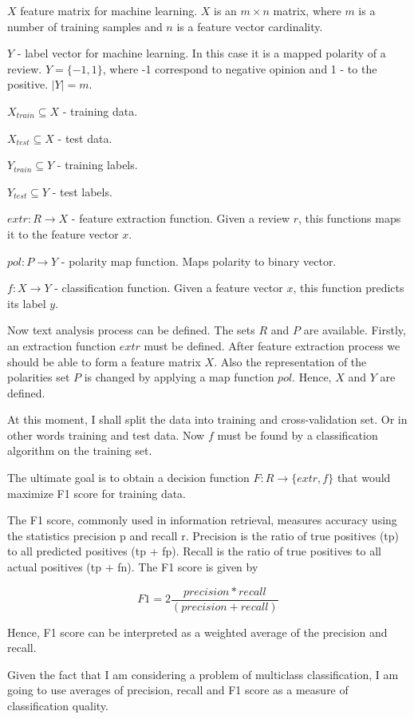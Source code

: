\documentclass[12pt]{report}
\begin{document}
$X$ feature matrix for machine learning. $X$ is an $m\times n$ matrix, where $m$ is a number of training samples and $n$ is a feature vector cardinality.

$Y$ - label vector for machine learning. In this case it is a mapped polarity of a review. $Y=\{-1,1\}$, where -1 correspond to negative opinion and 1 - to the positive. $|Y| = m$.

$X_{train} \subseteq X$ - training data.

$X_{test} \subseteq X$ - test data.

$Y_{train} \subseteq Y$ - training labels.

$Y_{test} \subseteq Y$ - test labels.

$extr: R \rightarrow X$ - feature extraction function. Given a review $r$, this functions maps it to the feature vector $x$.

$pol: P \rightarrow Y$ - polarity map function. Maps polarity to binary vector. 

$f: X \rightarrow Y$ - classification function. Given a feature vector $x$, this function predicts its label $y$.

Now text analysis process can be defined. The sets $R$ and $P$ are available.
Firstly, an extraction function $extr$ must be defined. After feature extraction process we should be able to form a feature matrix $X$. Also the representation of the polarities set $P$ is changed by applying a map function $pol$. Hence, $X$ and $Y$ are defined.

At this moment, I shall split the data into training and cross-validation set. Or in other words training and test data. Now $f$ must be found by a classification algorithm on the training set.

The ultimate goal is to obtain a decision function $F : R \rightarrow \{extr, f\}$ that would maximize F1 score for training data. 

The F1 score, commonly used in information retrieval, measures accuracy using the statistics precision p and recall r. Precision is the ratio of true positives (tp) to all predicted positives (tp + fp). Recall is the ratio of true positives to all actual positives (tp + fn). The F1 score is given by

$$F1 = 2 \dfrac{precision * recall} {(precision + recall)}$$

Hence, F1 score can be interpreted as a weighted average of the precision and recall.

Given the fact that I am considering a problem of multiclass classification, I am going to use averages of precision, recall and F1 score as a measure of classification quality.
\end{document}
